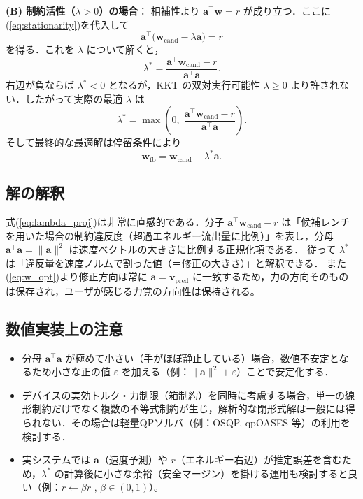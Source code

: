 \documentclass[uplatex]{jsarticle}
\begin{document}
\medskip\noindent
\textbf{(B) 制約活性（\(\lambda>0\)）の場合}：
相補性より \(\boldsymbol{a}^\top\boldsymbol{w}=r\) が成り立つ．ここに(\ref{eq:stationarity})を代入して
\[
\boldsymbol{a}^\top\big(\boldsymbol{w}_{\mathrm{cand}} - \lambda\boldsymbol{a}\big) = r
\]
を得る．これを \(\lambda\) について解くと，
\begin{equation}\label{eq:lambda_closed}
 \lambda^\ast = \frac{\boldsymbol{a}^\top\boldsymbol{w}_{\mathrm{cand}} - r}{\boldsymbol{a}^\top\boldsymbol{a}}.
\end{equation}
右辺が負ならば \(\lambda^\ast<0\) となるが，KKT の双対実行可能性 \(\lambda\ge 0\) より許されない．したがって実際の最適 \(\lambda\) は
\begin{equation}\label{eq:lambda_proj}
 \lambda^\ast = \max\!\left(0,\; \frac{\boldsymbol{a}^\top\boldsymbol{w}_{\mathrm{cand}} - r}{\boldsymbol{a}^\top\boldsymbol{a}} \right).
\end{equation}
そして最終的な最適解は停留条件により
\begin{equation}\label{eq:w_opt}
 \boldsymbol{w}_{\mathrm{fb}} = \boldsymbol{w}_{\mathrm{cand}} - \lambda^\ast \boldsymbol{a}.
\end{equation}

\subsection{解の解釈}
式(\ref{eq:lambda_proj})は非常に直感的である．分子 \(\boldsymbol{a}^\top\boldsymbol{w}_{\mathrm{cand}} - r\) は「候補レンチを用いた場合の制約違反度（超過エネルギー流出量に比例）」を表し，分母 \(\boldsymbol{a}^\top\boldsymbol{a}=\|\boldsymbol{a}\|^2\) は速度ベクトルの大きさに比例する正規化項である．
従って \(\lambda^\ast\) は「違反量を速度ノルムで割った値（＝修正の大きさ）」と解釈できる．
また(\ref{eq:w_opt})より修正方向は常に \(\boldsymbol{a}=\boldsymbol{v}_{\mathrm{pred}}\) に一致するため，力の方向そのものは保存され，ユーザが感じる力覚の方向性は保持される。

\subsection{数値実装上の注意}
\begin{itemize}
 \item 分母 \(\boldsymbol{a}^\top\boldsymbol{a}\) が極めて小さい（手がほぼ静止している）場合，数値不安定となるため小さな正の値 \(\varepsilon\) を加える（例：\(\|\boldsymbol{a}\|^2+\varepsilon\)）ことで安定化する．
 \item デバイスの実効トルク・力制限（箱制約）を同時に考慮する場合，単一の線形制約だけでなく複数の不等式制約が生じ，解析的な閉形式解は一般には得られない．その場合は軽量QPソルバ（例：OSQP, qpOASES 等）の利用を検討する．
 \item 実システムでは \(\boldsymbol{a}\)（速度予測）や \(r\)（エネルギー右辺）が推定誤差を含むため，\(\lambda^\ast\) の計算後に小さな余裕（安全マージン）を掛ける運用も検討すると良い（例：\(r \leftarrow \beta r\) , \(\beta\in(0,1)\)）。
\end{itemize}
\end{document}
